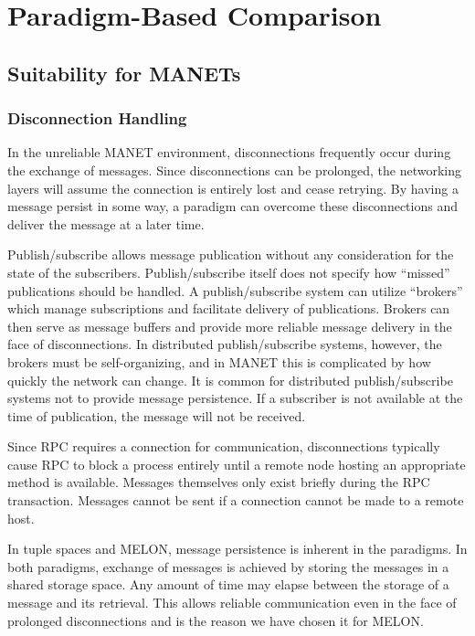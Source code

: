 \section{Paradigm-Based Comparison}\label{sec:para_eval}

\subsection{Suitability for MANETs}

\subsubsection{Disconnection Handling}

In the unreliable MANET environment, disconnections frequently occur during the exchange of messages. Since disconnections can be prolonged, the networking layers will assume the connection is entirely lost and cease retrying. By having a message persist in some way, a paradigm can overcome these disconnections and deliver the message at a later time.

Publish/subscribe allows message publication without any consideration for the state of the subscribers. Publish/subscribe itself does not specify how ``missed'' publications should be handled. A publish/subscribe system can utilize ``brokers'' which manage subscriptions and facilitate delivery of publications. Brokers can then serve as message buffers and provide more reliable message delivery in the face of disconnections. In distributed publish/subscribe systems, however, the brokers must be self-organizing, and in MANET this is complicated by how quickly the network can change. It is common for distributed publish/subscribe systems not to provide message persistence. If a subscriber is not available at the time of publication, the message will not be received.

Since RPC requires a connection for communication, disconnections typically cause RPC to block a process entirely until a remote node hosting an appropriate method is available. Messages themselves only exist briefly during the RPC transaction. Messages cannot be sent if a connection cannot be made to a remote host.

In tuple spaces and MELON, message persistence is inherent in the paradigms. In both paradigms, exchange of messages is achieved by storing the messages in a shared storage space. Any amount of time may elapse between the storage of a message and its retrieval. This allows reliable communication even in the face of prolonged disconnections and is the reason we have chosen it for MELON.


